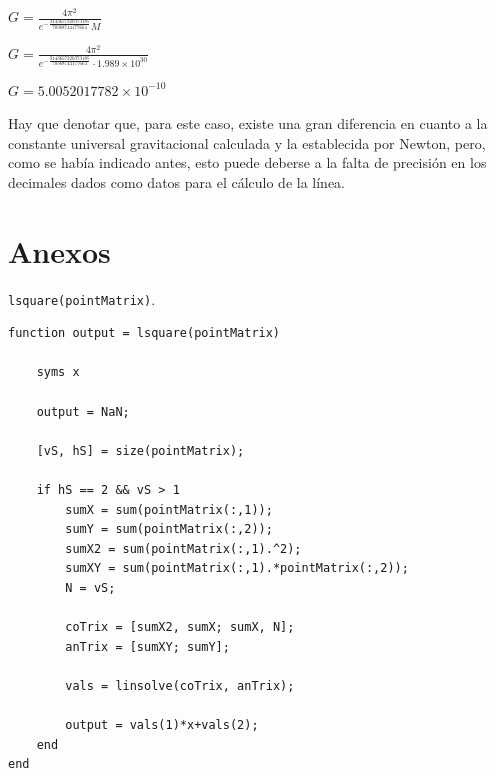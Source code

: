 \documentclass[english,notitlepage,letterpaper, 10pt]{article} %
\begin{document}
\begin{enumerate}
\begin{enumerate}
\begin{center}
        \begin{math}
          \displaystyle G = \frac{4\pi^2}{e^{-\frac{3143657320373185}{70368744177664}} M}
        \end{math}

        \begin{math}
          \displaystyle G = \frac{4\pi^2}{e^{-\frac{3143657320373185}{70368744177664}} \cdot 1.989 \times 10^{30}}
        \end{math}

        \begin{math}
          \displaystyle G = 5.0052017782\times 10^{-10}
        \end{math}
      \end{center}

      Hay que denotar que, para este caso, existe una gran diferencia en cuanto a la constante universal gravitacional calculada y la establecida por Newton, pero, como se había indicado antes, esto puede deberse a la falta de precisión en los decimales dados como datos para el cálculo de la línea.

    \end{enumerate}

\end{enumerate}

\newpage

\section{Anexos}

\texttt{lsquare(pointMatrix)}.
      
      \begin{lstlisting}
function output = lsquare(pointMatrix)

    syms x

    output = NaN;

    [vS, hS] = size(pointMatrix);

    if hS == 2 && vS > 1
        sumX = sum(pointMatrix(:,1));
        sumY = sum(pointMatrix(:,2));
        sumX2 = sum(pointMatrix(:,1).^2);
        sumXY = sum(pointMatrix(:,1).*pointMatrix(:,2));
        N = vS;

        coTrix = [sumX2, sumX; sumX, N];
        anTrix = [sumXY; sumY];

        vals = linsolve(coTrix, anTrix);

        output = vals(1)*x+vals(2);
    end
end
      \end{lstlisting}
\end{document}
